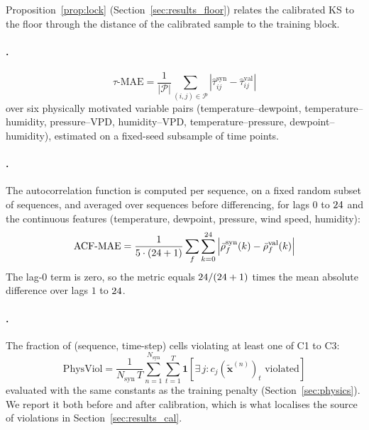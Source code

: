 \documentclass[preprint,12pt]{elsarticle}
\makeatletter
\let\ElsParagraph\paragraph
\def\StripRunInStop#1.\StripRunInMark#2\StripRunInEnd{#1}
\let\StripRunInMark\@empty
\renewcommand\paragraph[1]{\ElsParagraph{\StripRunInStop#1\StripRunInMark.\StripRunInMark\StripRunInEnd}}
\newcommand{\abs}[1]{\left| #1 \right|}
\makeatother
\begin{document}
Proposition~\ref{prop:lock} (Section~\ref{sec:results_floor}) relates the
calibrated KS to the floor through the distance of the calibrated sample to
the training block.

\paragraph{Kendall $\tau$ MAE $\downarrow$.}
\begin{equation}
  \tau\text{-MAE}
    = \frac{1}{\abs{\mathcal{P}}}\sum_{(i,j)\in\mathcal{P}}
      \abs{\hat{\tau}_{ij}^{\mathrm{syn}} - \hat{\tau}_{ij}^{\mathrm{val}}}
  \label{eq:tau_mae}
\end{equation}
over six physically motivated variable pairs
(temperature--dewpoint, temperature--humidity, pressure--VPD,
humidity--VPD, temperature--pressure, dewpoint--humidity), estimated on
a fixed-seed subsample of \protoTauSubsample{} time points.

\paragraph{ACF MAE $\downarrow$.}
The autocorrelation function is computed per sequence, on a fixed
random subset of \protoAcfNSeq{} sequences, and averaged over sequences
before differencing, for lags $0$ to $24$ and the
\protoNAcfFeaturesWord{} continuous features (temperature, dewpoint, pressure, wind speed,
humidity):
\begin{equation}
  \mathrm{ACF\text{-}MAE}
    = \frac{1}{\protoNAcfFeatures \cdot (\protoAcfLags + 1)}\sum_{f}\sum_{k=0}^{\protoAcfLags}
      \abs{\bar{\rho}_f^{\mathrm{syn}}(k) - \bar{\rho}_f^{\mathrm{val}}(k)}
  \label{eq:acf_mae}
\end{equation}
The lag-0 term is zero, so the metric equals $24/(24+1)$
times the mean absolute difference over lags $1$ to $24$.

\paragraph{Physical violation rate $\downarrow$.}
The fraction of (sequence, time-step) cells violating at least one of
C1 to C3:
\begin{equation}
  \mathrm{PhysViol}
    = \frac{1}{N_{\mathrm{syn}}\, T}
      \sum_{n=1}^{N_{\mathrm{syn}}}\sum_{t=1}^{T}
      \mathbf{1}\!\left[\exists\,j : c_j\!\left(\tilde{\mathbf{x}}^{(n)}\right)_t
      \text{ violated}\right]
  \label{eq:phys_viol}
\end{equation}
evaluated with the same constants as the training penalty
(Section~\ref{sec:physics}).  We report it both before and after
calibration, which is what localises the source of violations in
Section~\ref{sec:results_cal}.
\end{document}
